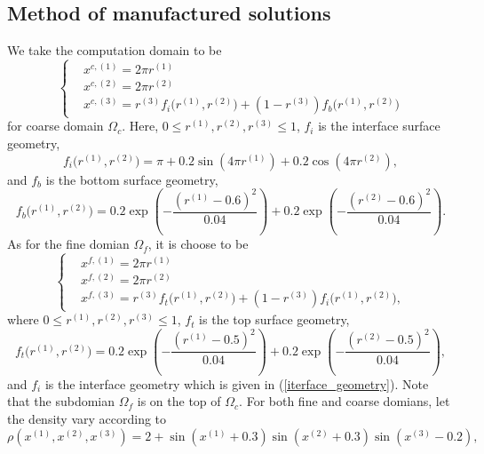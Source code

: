 \documentclass[a4paper]{article}
\begin{document}
\subsection{Method of manufactured solutions}\label{manufactured_sol}
We take the computation domain to be 
\begin{equation}\label{coarse_domain_manufactured}
 \left\{
\begin{aligned}
& x^{c,(1)} = 2\pi r^{(1)}\\
& x^{c,(2)} = 2\pi r^{(2)}\\
& x^{c,(3)} = r^{(3)}f_i\big(r^{(1)},r^{(2)}\big) + (1-r^{(3)})f_b\big(r^{(1)},r^{(2)}\big)
\end{aligned}
\right.
\end{equation}
for coarse domain $\Omega_c$. Here, $0\leq r^{(1)}, r^{(2)}, r^{(3)}\leq 1$, $f_i$ is the interface surface geometry,
\begin{equation}\label{iterface_geometry}
f_i\big(r^{(1)},r^{(2)}\big) = \pi+0.2\sin(4\pi r^{(1)})+0.2\cos(4\pi r^{(2)}),
\end{equation}
and 
$f_b$ is the bottom surface geometry,
\begin{equation}\label{bottom_geometry}
f_b\big(r^{(1)},r^{(2)}\big) = 0.2\exp\left(-\frac{(r^{(1)}-0.6)^2}{0.04}\right)+0.2\exp\left(-\frac{(r^{(2)}-0.6)^2}{0.04}\right).
\end{equation}
As for the fine domian $\Omega_f$, it is choose to be
\begin{equation}\label{fine_domain_manufactured}
\left\{
\begin{aligned}
& x^{f,(1)} = 2\pi r^{(1)}\\
& x^{f,(2)} = 2\pi r^{(2)}\\
& x^{f,(3)} = r^{(3)}f_t\big(r^{(1)},r^{(2)}\big) + (1-r^{(3)})f_i\big(r^{(1)},r^{(2)}\big),
\end{aligned}
\right.
\end{equation}
where $0\leq r^{(1)}, r^{(2)}, r^{(3)}\leq 1$, $f_t$ is the top surface geometry,
\begin{equation}\label{top_geometry}
f_t\big(r^{(1)},r^{(2)}\big) = 0.2\exp\left(-\frac{(r^{(1)}-0.5)^2}{0.04}\right)+0.2\exp\left(-\frac{(r^{(2)}-0.5)^2}{0.04}\right),
\end{equation}
and $f_i$ is the interface geometry which is given in (\ref{iterface_geometry}). Note that the subdomian 
$\Omega_f$ is on the top of $\Omega_c$. For both fine and coarse domians, let the density vary according to
\begin{equation}\label{density_function}
\rho(x^{(1)},x^{(2)},x^{(3)}) = 2 + \sin(x^{(1)}+0.3)\sin(x^{(2)}+0.3)\sin(x^{(3)}-0.2),
\end{equation}
\end{document}
